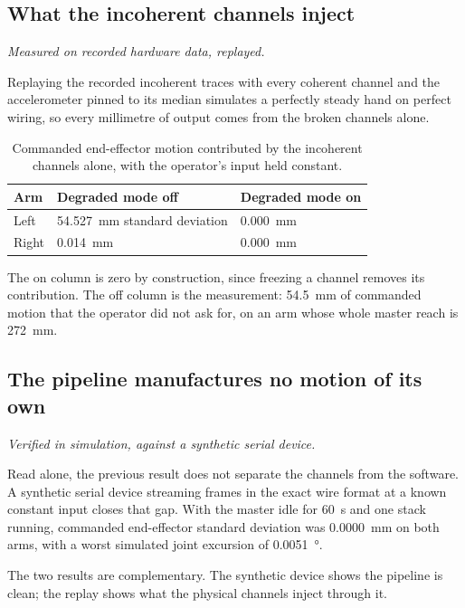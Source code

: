 \subsection{What the incoherent channels inject}

\emph{Measured on recorded hardware data, replayed.}

Replaying the recorded incoherent traces with every coherent channel and the
accelerometer pinned to its median simulates a perfectly steady hand on
perfect wiring, so every millimetre of output comes from the broken channels
alone.

\begin{table}[htbp]
  \centering
  \caption{Commanded end-effector motion contributed by the incoherent
  channels alone, with the operator's input held constant.}
  \label{tab:vibration}
  \begin{tabular}{@{}lll@{}}
    \toprule
    Arm & Degraded mode off & Degraded mode on \\
    \midrule
    Left  & \SI{54.527}{\milli\metre} standard deviation & \SI{0.000}{\milli\metre} \\
    Right & \SI{0.014}{\milli\metre} & \SI{0.000}{\milli\metre} \\
    \bottomrule
  \end{tabular}
\end{table}

The on column is zero by construction, since freezing a channel removes its
contribution. The off column is the measurement: \SI{54.5}{\milli\metre} of
commanded motion that the operator did not ask for, on an arm whose whole
master reach is \SI{272}{\milli\metre}.

\subsection{The pipeline manufactures no motion of its own}

\emph{Verified in simulation, against a synthetic serial device.}

Read alone, the previous result does not separate the channels from the
software. A synthetic serial device streaming frames in the exact wire format
at a known constant input closes that gap. With the master idle for
\SI{60}{\second} and one stack running, commanded end-effector standard
deviation was \SI{0.0000}{\milli\metre} on both arms, with a worst simulated
joint excursion of \SI{0.0051}{\degree}.

The two results are complementary. The synthetic device shows the pipeline is
clean; the replay shows what the physical channels inject through it.

